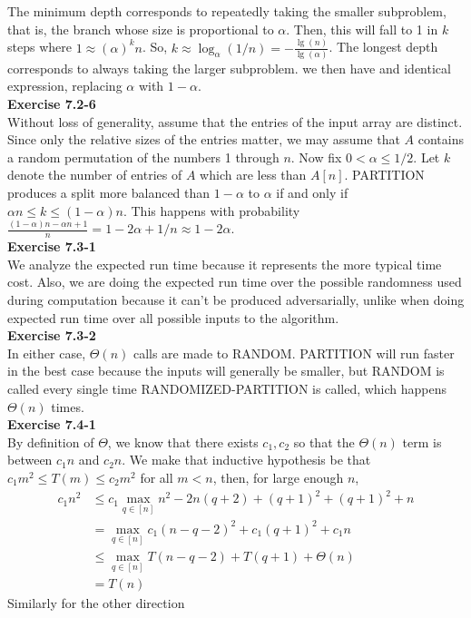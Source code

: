 \documentclass{article}
\begin{document}
The minimum depth corresponds to repeatedly taking the smaller subproblem, that is, the branch whose size is proportional to $\alpha$. Then, this will fall to 1 in $k$ steps where $1 \approx (\alpha)^k n$. So, $k \approx \log_{\alpha}(1/n) = - \frac{\lg(n)}{\lg(\alpha)} $. The longest depth corresponds to always taking the larger subproblem. we then have and identical expression, replacing $\alpha$ with $1-\alpha$.\\

\noindent\textbf{Exercise 7.2-6}\\

Without loss of generality, assume that the entries of the input array are distinct.  Since only the relative sizes of the entries matter, we may assume that $A$ contains a random permutation of the numbers 1 through $n$.  Now fix $0 < \alpha \leq 1/2$.  Let $k$ denote the number of entries of $A$ which are less than $A[n]$. PARTITION produces a split more balanced than $1-\alpha$ to $\alpha$ if and only if $\alpha n \leq k \leq (1-\alpha)n$.  This happens with probability $\frac{(1-\alpha)n - \alpha n + 1}{n} = 1-2\alpha + 1/n \approx 1 - 2\alpha$.\\

\noindent\textbf{Exercise 7.3-1}\\

We analyze the expected run time because it represents the more typical time cost. Also, we are doing the expected run time over the possible randomness used during computation because it can't be produced adversarially, unlike when doing expected run time over all possible inputs to the algorithm.\\

\noindent\textbf{Exercise 7.3-2}\\

In either case, $\Theta(n)$ calls are made to RANDOM.  PARTITION will run faster in the best case because the inputs will generally be smaller, but RANDOM is called every single time RANDOMIZED-PARTITION is called, which happens $\Theta(n)$ times. \\

\noindent\textbf{Exercise 7.4-1}\\

By definition of $\Theta$, we know that there exists $c_1,c_2$ so that the $\Theta(n)$ term is between $c_1 n$ and $c_2 n$. We make that inductive hypothesis be that $c_1 m^2 \le T(m) \le c_2 m^2$ for all $m < n$, then, for large enough $n$, 
\begin{align*}
c_1 n^2 &\le c_1 \max_{q\in [n]} n^2 -2 n(q+2) + (q+1)^2 +(q+1)^2 + n\\
& = \max_{q\in [n]} c_1 (n-q-2)^2 + c_1 (q+1)^2 +c_1 n\\
& \le \max_{q\in [n]} T( n-q-2) + T(q+1) + \Theta(n) \\
&= T(n)
\end{align*}
Similarly for the other direction
\\
\end{document}
